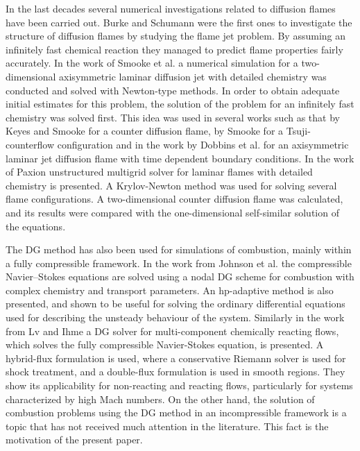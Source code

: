 In the last decades several numerical investigations related to diffusion flames have been carried out. Burke and Schumann were the first ones to investigate the structure of diffusion flames by studying the flame jet problem. \textcite{burkeDiffusionFlames1928} By assuming an infinitely fast chemical reaction they managed to predict flame properties fairly accurately. In the work of Smooke et al. \textcite{smookeNumericalSolutionTwoDimensional1986} a numerical simulation for a two-dimensional axisymmetric laminar diffusion jet  with detailed chemistry was conducted and solved with Newton-type methods. In order to obtain adequate initial estimates for this problem, the solution of the problem for an infinitely fast chemistry was solved first. This idea was used in several works such as that by Keyes and Smooke \textcite{keyesFlameSheetStarting1987} for a counter diffusion flame, by Smooke \textcite{smookeNumericalModelingAxisymmetric1992} for a Tsuji-counterflow configuration and in the work by Dobbins et al. \textcite{dobbinsFullyImplicitCompact2010} for an axisymmetric laminar jet diffusion flame with time dependent boundary conditions. In the work of Paxion \textcite{paxionDevelopmentParallelUnstructured2001} unstructured multigrid solver for laminar flames with detailed chemistry is presented. A Krylov-Newton method was used for solving several flame configurations. A two-dimensional counter diffusion flame was calculated, and its results were compared with the one-dimensional self-similar solution of the equations.

The DG method has also been used for simulations of combustion, mainly within a fully compressible framework. In the work from Johnson et al. \textcite{johnsonConservativeDiscontinuousGalerkin2020} the compressible Navier--Stokes equations are solved using a nodal DG scheme for combustion with complex chemistry and transport parameters. An hp-adaptive method is also presented, and shown to be useful for solving the ordinary differential equations used for describing the unsteady behaviour of the system.  Similarly in the work from Lv and Ihme \textcite{lvHighorderDiscontinuousGalerkin2017} a DG solver for multi-component chemically reacting flows, which solves the fully compressible Navier-Stokes equation, is presented. A hybrid-flux formulation is used, where a conservative Riemann solver is used for shock treatment, and a double-flux formulation is used in smooth regions. They show its applicability for non-reacting and reacting flows, particularly for systems characterized by high Mach numbers. On the other hand, the solution of combustion problems using the DG method in an incompressible framework is a topic that has not received much attention in the literature. This fact is the motivation of the present paper.

